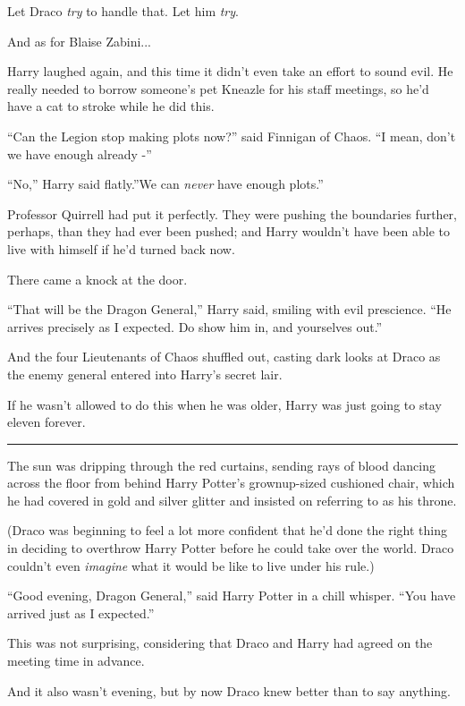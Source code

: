 Let Draco \emph{try} to handle that. Let him \emph{try}.

And as for Blaise Zabini...

Harry laughed again, and this time it didn't even take an effort to
sound evil. He really needed to borrow someone's pet Kneazle for his
staff meetings, so he'd have a cat to stroke while he did this.

``Can the Legion stop making plots now?'' said Finnigan of Chaos. ``I
mean, don't we have enough already -''

``No,'' Harry said flatly.''We can \emph{never} have enough plots.''

Professor Quirrell had put it perfectly. They were pushing the
boundaries further, perhaps, than they had ever been pushed; and Harry
wouldn't have been able to live with himself if he'd turned back now.

There came a knock at the door.

``That will be the Dragon General,'' Harry said, smiling with evil
prescience. ``He arrives precisely as I expected. Do show him in, and
yourselves out.''

And the four Lieutenants of Chaos shuffled out, casting dark looks at
Draco as the enemy general entered into Harry's secret lair.

If he wasn't allowed to do this when he was older, Harry was just going
to stay eleven forever.

\begin{center}\rule{3in}{0.4pt}\end{center}

The sun was dripping through the red curtains, sending rays of blood
dancing across the floor from behind Harry Potter's grownup-sized
cushioned chair, which he had covered in gold and silver glitter and
insisted on referring to as his throne.

(Draco was beginning to feel a lot more confident that he'd done the
right thing in deciding to overthrow Harry Potter before he could take
over the world. Draco couldn't even \emph{imagine} what it would be like
to live under his rule.)

``Good evening, Dragon General,'' said Harry Potter in a chill whisper.
``You have arrived just as I expected.''

This was not surprising, considering that Draco and Harry had agreed on
the meeting time in advance.

And it also wasn't evening, but by now Draco knew better than to say
anything.

